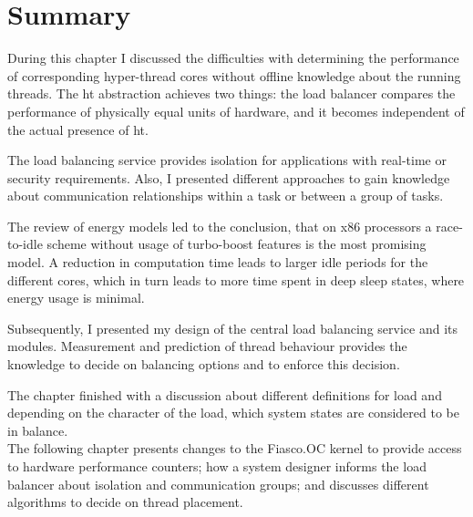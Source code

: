 \section{Summary}
\label{design:summary}

During this chapter I discussed the difficulties with determining the
performance of corresponding hyper-thread cores without offline knowledge about
the running threads.
The \gls{ht} abstraction achieves two things: the load balancer compares the
performance of physically equal units of hardware, and it becomes independent
of the actual presence of \gls{ht}.

The load balancing service provides isolation for applications with real-time
or security requirements.
Also, I presented different approaches to gain knowledge about communication
relationships within a task or between a group of tasks.

The review of energy models led to the conclusion, that on x86
processors a race-to-idle scheme without usage of turbo-boost features is the
most promising model.
A reduction in computation time leads to larger idle periods for the different
cores, which in turn leads to more time spent in deep sleep states, where
energy usage is minimal.

Subsequently, I presented my design of the central load balancing service and its
modules.
Measurement and prediction of thread behaviour provides the knowledge to decide
on balancing options and to enforce this decision.

The chapter finished with a discussion about different definitions for load
and depending on the character of the load, which system states are considered
to be in balance.
\\

The following chapter presents changes to the Fiasco.OC kernel to provide
access to hardware performance counters; how a system designer informs the load
balancer about isolation and communication groups; and discusses different
algorithms to decide on thread placement.
